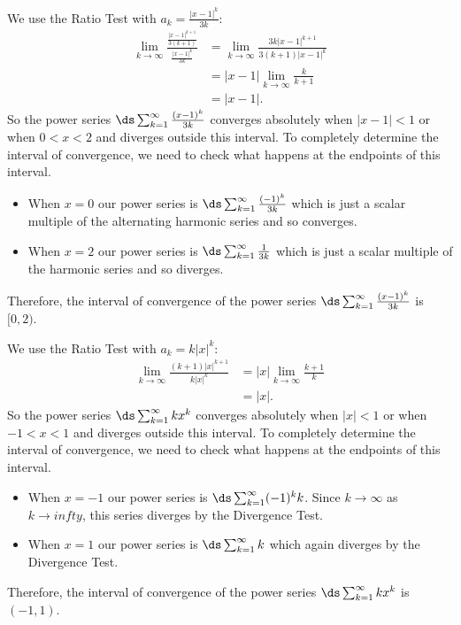 \begin{activitySolution}
\ba
    \item We use the Ratio Test with $a_k = \frac{|x-1|^k}{3k}$:
    \begin{align*}
    \lim_{k \to \infty} \frac{ \frac{|x-1|^{k+1}}{3(k+1)} }{ \frac{|x-1|^k}{3k} } &= \lim_{k \to \infty} \frac{3k|x-1|^{k+1}}{3(k+1)|x-1|^{k}} \\
        &= |x-1| \lim_{k \to \infty} \frac{k}{k+1} \\
        &= |x-1|.
    \end{align*}
    So the power series $\ds \sum_{k=1}^{\infty} \frac{(x-1)^k}{3k}$ converges absolutely when $|x-1| < 1$ or when $0 < x < 2$ and diverges outside this interval. To completely determine the interval of convergence, we need to check what happens at the endpoints of this interval.
    \begin{itemize}
    \item When $x=0$ our power series is $\ds \sum_{k=1}^{\infty} \frac{(-1)^k}{3k}$ which is just a scalar multiple of the alternating harmonic series and so converges.
    \item When $x=2$ our power series is $\ds \sum_{k=1}^{\infty} \frac{1}{3k}$ which is just a scalar multiple of the harmonic series and so diverges.
    \end{itemize}
    Therefore, the interval of convergence of the power series $\ds \sum_{k=1}^{\infty} \frac{(x-1)^k}{3k}$ is $[0,2)$.

    \item We use the Ratio Test with $a_k = k|x|^k$:
    \begin{align*}
    \lim_{k \to \infty} \frac{ (k+1)|x|^{k+1} }{ k|x|^k } &= |x|\lim_{k \to \infty} \frac{k+1}{k} \\
        &= |x|.
    \end{align*}
    So the power series $\ds \sum_{k=1}^{\infty} kx^k$ converges absolutely when $|x| < 1$ or when $-1 < x < 1$ and diverges outside this interval. To completely determine the interval of convergence, we need to check what happens at the endpoints of this interval.
    \begin{itemize}
    \item When $x=-1$ our power series is $\ds \sum_{k=1}^{\infty} (-1)^k k$. Since $k \to \infty$ as $k \to infty$, this series diverges by the Divergence Test.
    \item When $x=1$ our power series is $\ds \sum_{k=1}^{\infty} k$ which again diverges by the Divergence Test.
    \end{itemize}
    Therefore, the interval of convergence of the power series $\ds \sum_{k=1}^{\infty} kx^k$ is $(-1,1)$.


\end{activitySolution}
